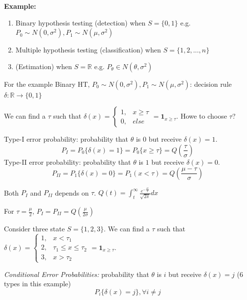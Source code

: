 \documentclass[11pt]{elegantbook}
\begin{document}
\textbf{Example:}
\begin{enumerate}[(1)]
    \item Binary hypothesis testing (detection) when $S=\{0,1\}$ e.g. $P_0\sim N(0,\sigma^2), P_1\sim N(\mu,\sigma^2)$
    \item Multiple hypothesis testing (classification) when $S=\{1,2,...,n\}$
    \item (Estimation) when $S=\mathbb{R}$ e.g. $P_\theta\in N(\theta,\sigma^2)$
\end{enumerate}
\begin{example}[ (Binary HT)]
    For the example Binary HT, $P_0\sim N(0,\sigma^2), P_1\sim N(\mu,\sigma^2)$: decision rule $\delta: \mathbb{R} \rightarrow \{0,1\}$

    We can find a $\tau$ such that $\delta(x)=\left\{\begin{matrix}
        1,&x\ge \tau\\
        0,& else
    \end{matrix}\right.=\mathbf{1}_{x\geq \tau}$. Howe to choose $\tau$?
    
    Type-I error probability: probability that $\theta$ is $0$ but receive $\delta(x)=1$. $$P_I=P_0\{\delta(x)=1\}=P_0\{x\geq \tau\}=Q\left(\frac{\tau}{\sigma}\right)$$
    Type-II error probability: probability that $\theta$ is $1$ but receive $\delta(x)=0$. $$P_{II}=P_1\{\delta(x)=0\}=P_1(x<\tau)=Q(\frac{\mu-\tau}{\sigma})$$
    
    Both $P_I$ and $P_{II}$ depends on $\tau$. $Q(t)=\int_t^\infty\frac{e^{-\frac{x^2}{2}}}{\sqrt{2\pi}}dx$
    
    For $\tau=\frac{\mu}{2}$, $P_I=P_{II}=Q\left(\frac{\mu}{2\sigma}\right)$
\end{example}

\begin{example}[ (Multiple HT)]
    Consider three state $S=\{1,2,3\}$.
    We can find a $\tau$ such that $\delta(x)=\left\{\begin{matrix}
        1,&x< \tau_1\\
        2,& \tau_1\leq x\leq \tau_2\\
        3,& x>\tau_2
    \end{matrix}\right.=\mathbf{1}_{x\geq \tau}$.
    
    \textit{Conditional Error Probabilities:} probability that $\theta$ is $i$ but receive $\delta(x)=j$ (6 types in this example) $$P_i\{\delta(x)=j\}, \forall i\neq j$$
\end{example}
\end{document}
